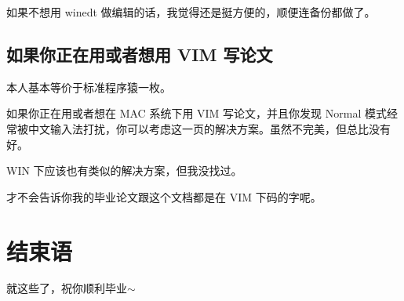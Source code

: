 如果不想用 winedt 做编辑的话，我觉得还是挺方便的，顺便连备份都做了。


\section{如果你正在用或者想用 VIM 写论文}

本人基本等价于标准程序猿一枚。

如果你正在用或者想在 MAC 系统下用 VIM 写论文，并且你发现 Normal 模式经常被中文输入法打扰，你可以考虑这一页的解决方案。虽然不完美，但总比没有好。

WIN 下应该也有类似的解决方案，但我没找过。

才不会告诉你我的毕业论文跟这个文档都是在 VIM 下码的字呢。


\chapter{结束语}
\label{chp:ending}

就这些了，祝你顺利毕业$\sim$


